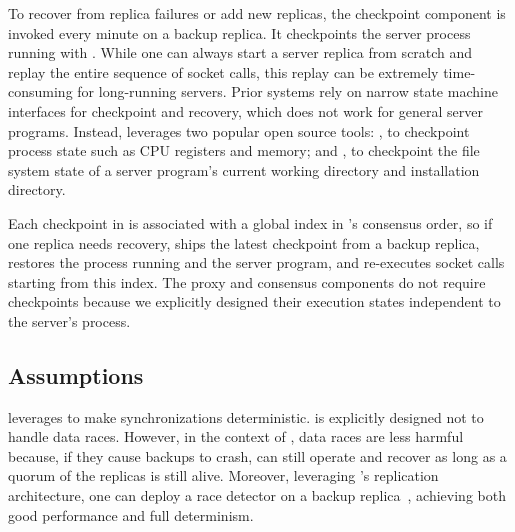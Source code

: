 To recover from replica failures or add new replicas, the checkpoint 
component is invoked every minute on a backup replica. It
checkpoints the server process running with \dmt.  While one can always start a 
server replica from scratch and replay the entire sequence of socket calls, 
this replay can be extremely time-consuming for long-running servers.  Prior 
\smr systems rely on narrow state machine interfaces for checkpoint and
recovery, which does not work for general server programs. Instead, \xxx
leverages two popular open source tools: \criu, to checkpoint process 
state such as CPU registers and memory; and \lxc, to checkpoint the file 
system state of a server program's current working directory and installation 
directory.

Each checkpoint in \xxx is associated with a global index in \paxos's consensus 
order, so if one replica needs recovery, \xxx ships the latest checkpoint from a 
backup replica, restores the process running \dmt and the server program, and 
re-executes socket calls starting from this index. The proxy and consensus 
components do not require checkpoints because we explicitly designed their 
execution states independent to the server's process.

% 

\subsection{Assumptions} \label{sec:limit}


\xxx leverages \parrot to make synchronizations deterministic.  \parrot is
explicitly designed not to handle data races. However, in the context of \xxx,
data races are less harmful because, if they cause backups to crash, \xxx
can still operate and recover as long as a quorum of the replicas is
still alive. Moreover, leveraging \xxx's replication architecture, one can 
deploy a race detector on a backup replica~\cite{repframe:apsys15}, achieving 
both good \xxx performance and full determinism.

